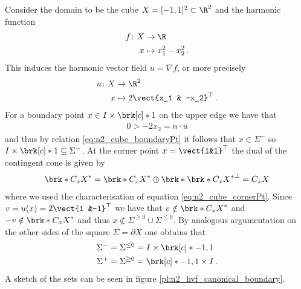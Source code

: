 \begin{example}\label{ex:n2_hvf_canonical}
  Consider the domain to be the cube $X=[-1,1]^2\subset\R^2$
  and the harmonic function
  \begin{equation}
    \begin{aligned}
    f\colon X&\to\R \\
    x&\mapsto x_1^2-x_2^2\,.\label{eq:n2_hf_canonical}
    \end{aligned}
  \end{equation}
  This induces the harmonic vector field $u=\nabla f$, or more precisely
  \begin{equation}
    \begin{aligned}
    u\colon X&\to\R^2 \\
    x&\mapsto 2\vect{x_1 & -x_2}^\top\,.\label{eq:n2_hvf_canonical}
    \end{aligned}
  \end{equation}
  For a boundary point $x\in I\times\brk[c]*{1}$ on the upper edge we have that
  \begin{align*}
    0>  -2x_2=n\cdot u
  \end{align*}
  and thus by relation \eqref{eq:n2_cube_boundaryPt} it follows that $x\in\Sigma^{-}$
  so $I\times\brk[c]*{1}\subseteq\Sigma^{-}$.
  At the corner point $x=\vect{1&1}^\top$ the dual of the contingent cone is given by
  \begin{align}
    \brk*{C_xX}^*=\brk*{C_xX}^*\oplus\brk*{\brk*{C_xX}^*}^\perp =C_xX\label{eq:n2_hvf_canonical_CxX}
  \end{align}
  where we used the characterisation of equation \eqref{eq:n2_cube_cornerPt}.
  Since $v=u(x)=2\vect{1 &-1}^\top$ we have that $v\notin\brk*{C_xX}^*$ and $-v\notin\brk*{C_xX}^*$
  and thus $x\notin\Sigma^{\geq0}\cup\Sigma^{\leq0}$.
  By analogous argumentation on the other sides of the square $\Sigma=\partial X$
  one obtains that
  \begin{align*}
    \Sigma^-=\Sigma^{\leq0}&=I\times\brk[c]*{-1,1}\\
    \Sigma^+=\Sigma^{\geq0}&=\brk[c]*{-1,1}\times I\,.
  \end{align*}
  A sketch of the sets can be seen in figure \ref{pl:n2_hvf_canonical_boundary}.
\end{example}

